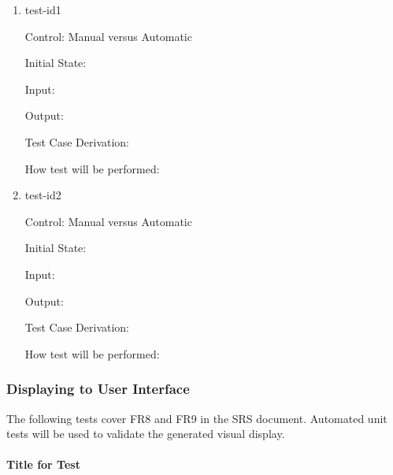 \documentclass[12pt, titlepage]{article}
\begin{document}
\begin{enumerate}
	
	\item{test-id1\\}
	
	Control: Manual versus Automatic
	
	Initial State: 
	
	Input: 
	
	Output: 
	
	Test Case Derivation: 
	
	How test will be performed: 
	
	\item{test-id2\\}
	
	Control: Manual versus Automatic
	
	Initial State: 
	
	Input: 
	
	Output: 
	
	Test Case Derivation: 
	
	How test will be performed: 
	
\end{enumerate}

\subsubsection{Displaying to User Interface}

The following tests cover  FR8 and FR9 in the SRS document. Automated unit tests will be used to validate the generated visual display.

\paragraph{Title for Test}
\end{document}
